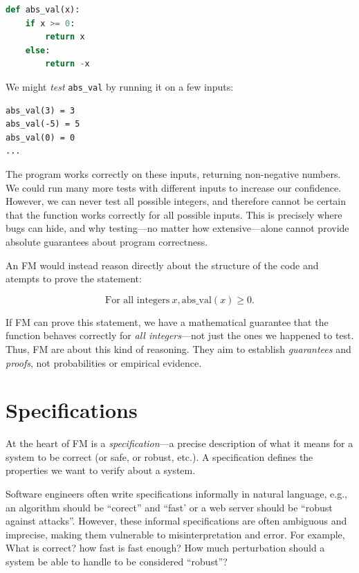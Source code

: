 \documentclass[oneside,11pt,dvipsnames]{book}
\numberwithin{equation}{section}
\theoremstyle{definition}
\theoremstyle{remark}
\newcommand{\code}[1]{\texttt{#1}}
\begin{document}
\begin{lstlisting}[language=Python, caption={Absolute value function}, label={lst:abs_val}]
def abs_val(x):
    if x >= 0:
        return x
    else:
        return -x
\end{lstlisting}

We might \emph{test} \code{abs\_val} by running it on a few inputs:

\begin{lstlisting}
abs_val(3) = 3
abs_val(-5) = 5
abs_val(0) = 0
...
\end{lstlisting}

The program works correctly on these inputs, returning non-negative numbers. We could run many more tests with different inputs to increase our confidence. However, we can never test all possible integers, and therefore cannot be certain that the function works correctly for all possible inputs.
This is precisely where bugs can hide, and why testing---no matter how extensive---alone cannot provide absolute guarantees about program correctness. 

An FM would instead reason directly about the structure of the code and atempts to prove the statement:

\begin{equation}\label{eq:abs_val_nonneg}
 \text{For all integers}~x, \text{abs\_val}(x) \geq 0.
\end{equation}

If FM can prove this statement, we have a mathematical guarantee that the function behaves correctly for \emph{all integers}---not just the ones we happened to test.
Thus, FM are about this kind of reasoning. They aim to establish \emph{guarantees} and \emph{proofs}, not probabilities or empirical evidence.


\section{Specifications}\label{sec:fm-spec}

At the heart of FM is a \emph{specification}---a precise description of what it means for a system to be correct (or safe, or robust, etc.). A specification defines the properties we want to verify about a system.

Software engineers often write specifications informally in natural language, e.g., an algorithm should be ``corect'' and ``fast' or a web server should be ``robust against attacks''. However, these informal specifications are often ambiguous and imprecise, making them vulnerable to misinterpretation and error. For example, What is correct? how fast is fast enough? How much perturbation should a system be able to handle to be considered ``robust''?  
\end{document}
